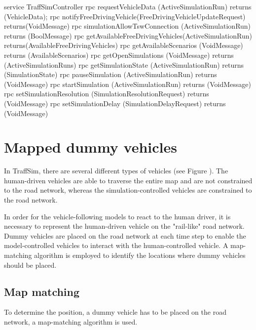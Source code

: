 \begin{GenericCode}[caption={TraffSim API proto}, label={lst:traffSim-api-proto}]
service TraffSimController {
    rpc requestVehicleData (ActiveSimulationRun)
        returns (VehicleData);
    rpc notifyFreeDrivingVehicle(FreeDrivingVehicleUpdateRequest)
        returns(VoidMessage){}
    rpc simulationAllowTswConnection (ActiveSimulationRun)
        returns (BoolMessage) {}
    rpc getAvailableFreeDrivingVehicles(ActiveSimulationRun)
        returns(AvailableFreeDrivingVehicles){}
    rpc getAvailableScenarios (VoidMessage)
        returns (AvailableScenarios){}
    rpc getOpenSimulations (VoidMessage)
        returns (ActiveSimulationRuns){}
    rpc getSimulationState (ActiveSimulationRun)
        returns (SimulationState){}
    rpc pauseSimulation (ActiveSimulationRun)
        returns (VoidMessage){}
    rpc startSimulation (ActiveSimulationRun)
        returns (VoidMessage){}
    rpc setSimulationResolution (SimulationResolutionRequest)
        returns (VoidMessage){}
    rpc setSimulationDelay (SimulationDelayRequest)
        returns (VoidMessage){}
}\end{GenericCode}

\section{Mapped dummy vehicles}\label{sec:mapped-dummy-vehicles}
    In TraffSim, there are several different types of vehicles (see Figure ).%
    The human-driven vehicles are able to traverse the entire map and are not constrained to the road network, whereas the simulation-controlled vehicles are constrained to the road network.

    In order for the vehicle-following models to react to the human driver, it is necessary to represent the human-driven vehicle on the "rail-like" road network.
    Dummy vehicles are placed on the road network at each time step to enable the model-controlled vehicles to interact with the human-controlled vehicle.
    A map-matching algorithm is employed to identify the locations where dummy vehicles should be placed.

    \subsection{Map matching}\label{subsec:map-matching}
        To determine the position, a dummy vehicle has to be placed on the road network, a map-matching algorithm is used.

